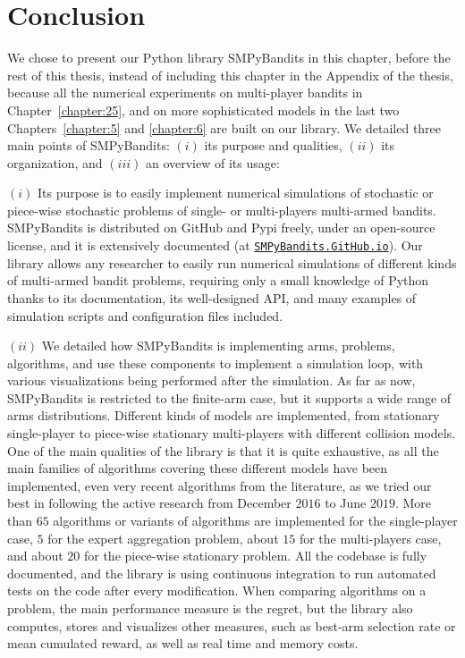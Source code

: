\newpage  %
\newpage  %
\section{Conclusion}
\label{sec:3:conclusion}


We chose to present our Python library SMPyBandits in this chapter, before the rest of this thesis, instead of including this chapter in the Appendix of the thesis, because all the numerical experiments on multi-player bandits in Chapter~\ref{chapter:25}, and on more sophisticated models in the last two Chapters~\ref{chapter:5} and \ref{chapter:6} are built on our library.
%
We detailed three main points of SMPyBandits:
$(i)$ its purpose and qualities,
$(ii)$ its organization,
and $(iii)$ an overview of its usage:
%

$(i)$
Its purpose is to easily implement numerical simulations of stochastic or piece-wise stochastic problems of single- or multi-players multi-armed bandits.
SMPyBandits is distributed on GitHub and Pypi freely, under an open-source license, and it is extensively documented (at \href{https://SMPyBandits.GitHub.io}{\texttt{SMPyBandits.GitHub.io}}).
Our library allows any researcher to easily run numerical simulations of different kinds of multi-armed bandit problems, requiring only a small knowledge of Python thanks to its documentation, its well-designed API, and many examples of simulation scripts and configuration files included.

$(ii)$
We detailed how SMPyBandits is implementing arms, problems, algorithms, and use these components to implement a simulation loop, with various visualizations being performed after the simulation.
As far as now, SMPyBandits is restricted to the finite-arm case, but it supports a wide range of arms distributions.
Different kinds of models are implemented, from stationary single-player to piece-wise stationary multi-players with different collision models.
One of the main qualities of the library is that it is quite exhaustive, as all the main families of algorithms covering these different models have been implemented, even very recent algorithms from the literature, as we tried our best in following the active research from December $2016$ to June $2019$.
More than $65$ algorithms or variants of algorithms are implemented for the single-player case, $5$ for the expert aggregation problem, about $15$ for the multi-players case, and about $20$ for the piece-wise stationary problem.
All the codebase is fully documented, and the library is using continuous integration to run automated tests on the code after every modification.
%
When comparing algorithms on a problem, the main performance measure is the regret, but the library also computes, stores and visualizes other measures, such as best-arm selection rate or mean cumulated reward, as well as real time and memory costs.

